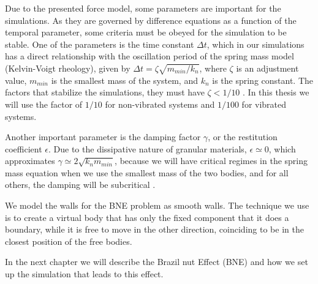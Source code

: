     Due to the presented force model, some parameters are important for the simulations. As they are governed by difference equations as a function of the temporal parameter, some criteria must be obeyed for the simulation to be stable. One of the parameters is the time constant $\Delta t$, which in our simulations has a direct relationship with the oscillation period of the spring mass model (Kelvin-Voigt rheology), given by $\Delta t = \zeta \sqrt{m_{min}/k_{n}}$, where $\zeta$ is an adjustment value, $m_{min}$ is the smallest mass of the system, and $k_{n}$ is the spring constant. The factors that stabilize the simulations, they must have $\zeta < 1/10$ \cite{Dissertacao, Caio-Thesis, Computer_Simulation_of_Liquids}. In this thesis we will use the factor of $1/10$ for non-vibrated systems and $1/100$ for vibrated systems. 


    Another important parameter is the damping factor $\gamma$, or the restitution coefficient $\epsilon$. Due to the dissipative nature of granular materials, $\epsilon \simeq 0$, which approximates $\gamma \simeq 2\sqrt{k_{n}{m}_{min}}$, because we will have critical regimes in the spring mass equation when we use the smallest mass of the two bodies, and for all others, the damping will be subcritical \cite{Bouzid-Thesis, Luding-Thesis}. 

    We model the walls for the BNE problem as smooth walls. The technique we use is to create a virtual body that has only the fixed component that it does a boundary, while it is free to move in the other direction, coinciding to be in the closest position of the free bodies.

    In the next chapter we will describe the Brazil nut Effect (BNE) and how we set up the simulation that leads to this effect.

